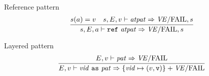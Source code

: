 \begin{inference-rule}{Reference pattern}
\begin{equation}\label{rule:dynamic-core:reference-pattern}
\vcenter{\infer{\s,\E,\A\ts\REF\ \atpat\ra \VE/\fail,\s}
  {\s(\A)=\V
    & \s,\E,\V\ts\atpat\ra\VE/\fail,\s}}
\end{equation}
\end{inference-rule}

\begin{inference-rule}{Layered pattern}
\begin{equation}\label{rule:dynamic-core:layered-pattern}
\vcenter{\infer{\E,\V\ts\layeredvidpata\ra\{\vid\mapsto(\V,\isv)\}+\VE/\fail}
  {\E,\V\ts\pat\ra\VE/\fail}}
\end{equation}
\end{inference-rule}


